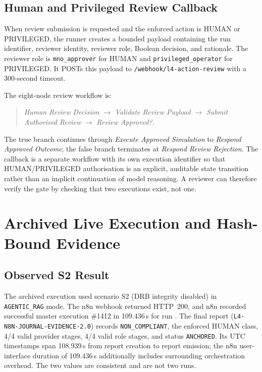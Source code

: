 \documentclass[journal]{IEEEtran}
\newif\ifshowrevisions
\newcommand{\rev}[1]{{\ifshowrevisions\color{blue}\else\color{black}\fi #1}}
\newcommand{\artifactpath}[1]{\path{#1}}
\begin{document}
\subsection{Human and Privileged Review Callback}
When review submission is requested and the enforced action is HUMAN or
PRIVILEGED, the runner creates a bounded payload containing the run
identifier, reviewer identity, reviewer role, Boolean decision, and rationale.
The reviewer role is \texttt{mno\_approver} for HUMAN and
\texttt{privileged\_operator} for PRIVILEGED. It POSTs this payload to
\texttt{/webhook/l4-action-review} with a 300-second timeout.

The eight-node review workflow is:
\begin{quote}
\emph{Human Review Decision} $\rightarrow$
\emph{Validate Review Payload} $\rightarrow$
\emph{Submit Authorised Review} $\rightarrow$
\emph{Review Approved?}.
\end{quote}
The true branch continues through \emph{Execute Approved Simulation} to
\emph{Respond Approved Outcome}; the false branch terminates at
\emph{Respond Review Rejection}. The callback is a separate workflow with its
own execution identifier so that HUMAN/PRIVILEGED authorisation is an
explicit, auditable state transition rather than an implicit continuation of
model reasoning. A reviewer can therefore verify the gate by checking that two
executions exist, not one.

\section{Archived Live Execution and Hash-Bound Evidence}
\label{sec:live-run}

\subsection{Observed S2 Result}
The archived execution used scenario S2 (DRB integrity disabled) in
\texttt{AGENTIC\_RAG} mode. The \rev{n8n} webhook returned HTTP~200, and n8n
recorded successful master execution \#1412 in 109.436\,s for run
\artifactpath{d7c0e31b-fa9e-437b-87d2-acdeef4a6ba1}. The final report
(\texttt{L4-N8N-JOURNAL-EVIDENCE-2.0}) records
\texttt{NON\_COMPLIANT}, the enforced HUMAN class, 4/4 valid provider stages,
4/4 valid role stages, and status \texttt{ANCHORED}. Its UTC timestamps span
108.939\,s from report creation to report emission; the n8n user-interface
duration of 109.436\,s additionally includes surrounding orchestration
overhead. The two values are consistent and are not two runs.
\end{document}
